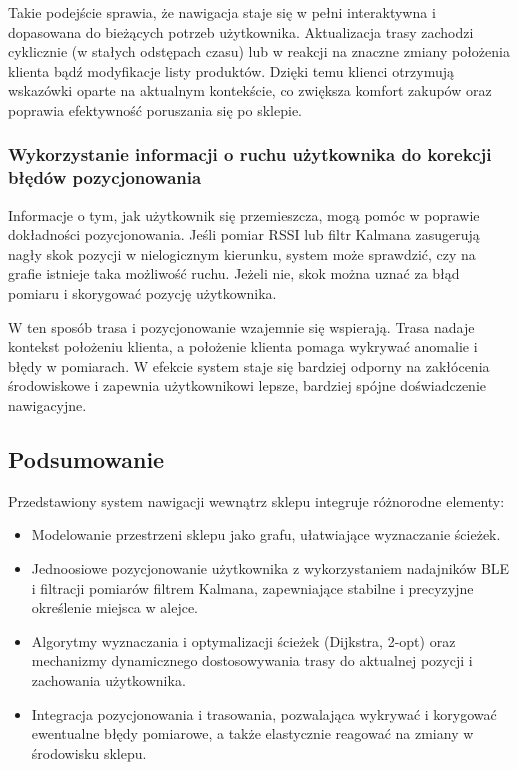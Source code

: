 Takie podejście sprawia, że nawigacja staje się w pełni interaktywna i dopasowana do bieżących potrzeb użytkownika. Aktualizacja trasy zachodzi cyklicznie (w stałych odstępach czasu) lub w reakcji na znaczne zmiany położenia klienta bądź modyfikacje listy produktów. Dzięki temu klienci otrzymują wskazówki oparte na aktualnym kontekście, co zwiększa komfort zakupów oraz poprawia efektywność poruszania się po sklepie.

\subsubsection{Wykorzystanie informacji o ruchu użytkownika do korekcji błędów pozycjonowania}
Informacje o tym, jak użytkownik się przemieszcza, mogą pomóc w poprawie dokładności pozycjonowania. Jeśli pomiar RSSI lub filtr Kalmana zasugerują nagły skok pozycji w nielogicznym kierunku, system może sprawdzić, czy na grafie istnieje taka możliwość ruchu. Jeżeli nie, skok można uznać za błąd pomiaru i skorygować pozycję użytkownika.

W ten sposób trasa i pozycjonowanie wzajemnie się wspierają. Trasa nadaje kontekst położeniu klienta, a położenie klienta pomaga wykrywać anomalie i błędy w pomiarach. W efekcie system staje się bardziej odporny na zakłócenia środowiskowe i zapewnia użytkownikowi lepsze, bardziej spójne doświadczenie nawigacyjne.

\subsection{Podsumowanie}
Przedstawiony system nawigacji wewnątrz sklepu integruje różnorodne elementy:
\begin{itemize}
    \item Modelowanie przestrzeni sklepu jako grafu, ułatwiające wyznaczanie ścieżek.
    \item Jednoosiowe pozycjonowanie użytkownika z wykorzystaniem nadajników BLE i filtracji pomiarów filtrem Kalmana, zapewniające stabilne i precyzyjne określenie miejsca w alejce.
    \item Algorytmy wyznaczania i optymalizacji ścieżek (Dijkstra, 2-opt) oraz mechanizmy dynamicznego dostosowywania trasy do aktualnej pozycji i zachowania użytkownika.
    \item Integracja pozycjonowania i trasowania, pozwalająca wykrywać i korygować ewentualne błędy pomiarowe, a także elastycznie reagować na zmiany w środowisku sklepu.
\end{itemize}
